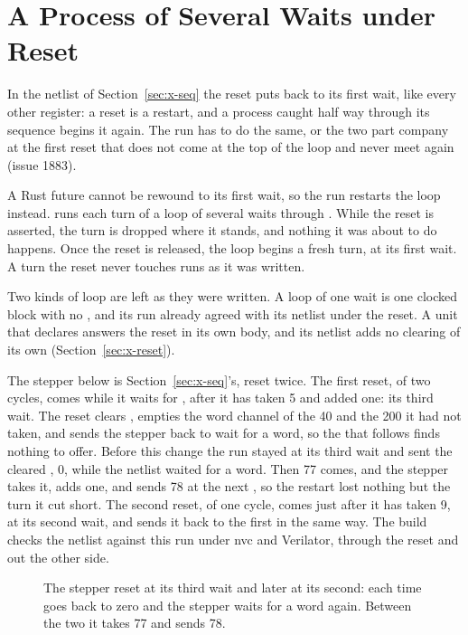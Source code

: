 \section{A Process of Several Waits under Reset}
\label{sec:x-seq-reset}

In the netlist of Section~\ref{sec:x-seq} the reset puts
 back to its first wait, like every other register: a
reset is a restart, and a process caught half way through its
sequence begins it again. The run has to do the same, or the two part
company at the first reset that does not come at the top of the loop
and never meet again (issue 1883).

A Rust future cannot be rewound to its first wait, so the run restarts
the loop instead. \code{\#[lower]} runs each turn of a loop of several
waits through . While the reset is
asserted, the turn is dropped where it stands, and nothing it was
about to do happens. Once the reset is released, the loop begins a
fresh turn, at its first wait. A turn the reset never touches runs as
it was written.

Two kinds of loop are left as they were written. A loop of one wait is
one clocked block with no , and its run already agreed
with its netlist under the reset. A unit that declares 
answers the reset in its own body, and its netlist adds no clearing of
its own (Section~\ref{sec:x-reset}).

The stepper below is Section~\ref{sec:x-seq}'s, reset twice.
The first reset, of two cycles, comes while it waits for ,
after it has taken 5 and added one: its third wait. The reset clears
, empties the word channel of the 40 and the 200 it had
not taken, and sends the stepper back to wait for a word, so the
 that follows finds nothing to offer. Before this change the
run stayed at its third wait and sent the cleared , 0,
while the netlist waited for a word.
Then 77 comes, and the stepper takes it, adds one, and sends 78 at the
next , so the restart lost nothing but the turn it cut short.
The second reset, of one cycle, comes just after it has taken 9, at
its second wait, and sends it back to the first in the same way.
The build checks the
netlist against this run under nvc and Verilator, through the reset
and out the other side.

\begin{figure}[htbp]
\centering

\caption{The stepper reset at its third wait and later at its
second: each time  goes back to zero and the stepper waits
for a word again. Between the two it takes 77 and sends 78.}
\label{fig:x-seq-reset}
\end{figure}




